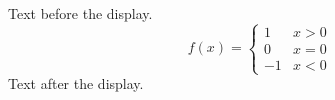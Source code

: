 \documentclass{article}
\begin{document}
Text before the display.
\[
  f(x) = \begin{cases} 1 & x > 0 \\ 0 & x = 0 \\ -1 & x < 0 \end{cases}
\]
Text after the display.
\end{document}
